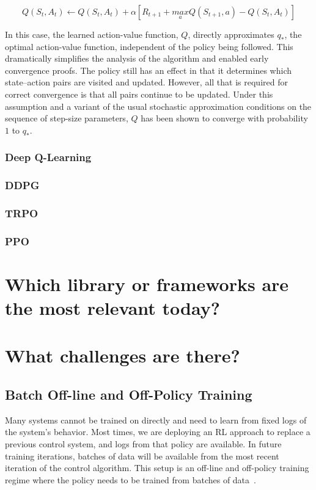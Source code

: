 \documentclass[letterpaper, 10 pt]{IEEEconf}
\begin{document}
$$
Q(S_t,A_t)\leftarrow Q(S_t,A_t) +\alpha\left[R_{t+1}+ \underset{a}{max}Q(S_{t+1},a)-Q(S_t,A_t) \right]
$$

In this case, the learned action-value function, $Q$, directly
approximates $q_*$, the optimal action-value function, independent of
the policy being followed. This dramatically simplifies the analysis
of the algorithm and enabled early convergence proofs. The policy
still has an effect in that it determines which state–action pairs are
visited and updated. However, all that is required for correct
convergence is that all pairs continue to be updated. Under this
assumption and a variant of the usual stochastic approximation
conditions on the sequence of step-size parameters, $Q$ has been shown
to converge with probability $1$ to $q_*$.

\subsubsection{Deep Q-Learning}



\subsubsection{DDPG}

\subsubsection{TRPO}

\subsubsection{PPO}


\section{Which library or frameworks are the most relevant today?}

\section{What challenges are there?}

\subsection{Batch Off-line and Off-Policy Training}

Many systems cannot be trained on directly and need to learn from
fixed logs of the system’s behavior. Most times, we are deploying an
RL approach to replace a previous control system, and logs from that
policy are available. In future training iterations, batches of data
will be available from the most recent iteration of the control
algorithm. This setup is an off-line and off-policy training regime
where the policy needs to be trained from batches of data~\cite{deepmind2019}.
\end{document}
